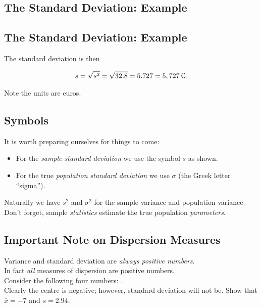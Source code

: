 \documentclass[]{report}
\begin{document}
\subsection{The Standard Deviation: Example}
{ \subsection{The Standard Deviation: Example}}

The standard deviation is then

\begin{align*}
s = \sqrt{s^2} = \sqrt{32.8} = 5.727 = 5,727 \, \text{\texteuro}.\\
\end{align*}

{ Note the units are euros}.




\subsection{Symbols}

It is worth preparing ourselves for things to come:\\[0.4cm]

\begin{itemize}\itemsep0.4cm
	\item For the \emph{sample standard deviation} we use the symbol $s$ as shown.
	\item For the true \emph{population standard deviation} we use $\sigma$ (the Greek letter ``sigma'').\\[0.6cm]
\end{itemize}

Naturally we have $s^2$ and $\sigma^2$ for the sample variance and population variance.\\[0.8cm]

Don't forget, sample \emph{statistics} estimate the true population \emph{parameters}.




\subsection{Important Note on Dispersion Measures}


Variance and standard deviation are {\emph{always positive numbers}}.\\[0.7cm]

In fact \emph{all} measures of dispersion are positive numbers.\\[1.8cm]

Consider the following four  numbers: .\\[0.3cm] Clearly the centre is negative; however, standard deviation will not be. Show that $\bar x = -7$ and $s = 2.94$.
\end{document}
